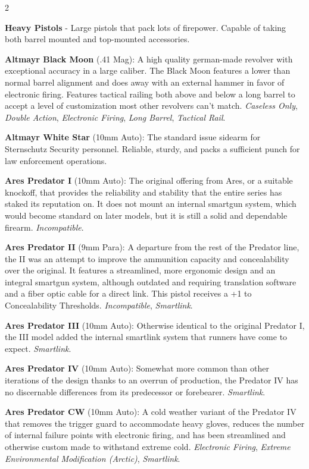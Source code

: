 \documentclass[
  oneside]{article}
\begin{document}
\begin{multicols}{2}

\textbf{Heavy Pistols} - Large pistols that pack
lots of firepower. Capable of taking both barrel
mounted and top-mounted accessories.

\textbf{Altmayr Black Moon} (.41 Mag): A high
quality german-made revolver with exceptional
accuracy in a large caliber. The Black Moon
features a lower than normal barrel alignment and
does away with an external hammer in favor of
electronic firing. Features tactical railing both
above and below a long barrel to accept a level of
customization most other revolvers can't match.
\emph{Caseless Only}, \emph{Double Action},
\emph{Electronic Firing}, \emph{Long Barrel},
\emph{Tactical Rail}.

\textbf{Altmayr White Star} (10mm Auto): The
standard issue sidearm for Sternschutz Security
personnel. Reliable, sturdy, and packs a
sufficient punch for law enforcement operations.

\textbf{Ares Predator I} (10mm Auto): The original
offering from Ares, or a suitable knockoff, that
provides the reliability and stability that the
entire series has staked its reputation on. It
does not mount an internal smartgun system, which
would become standard on later models, but it is
still a solid and dependable firearm.
\emph{Incompatible}.

\textbf{Ares Predator II} (9mm Para): A departure
from the rest of the Predator line, the II was an
attempt to improve the ammunition capacity and
concealability over the original. It features a
streamlined, more ergonomic design and an integral
smartgun system, although outdated and requiring
translation software and a fiber optic cable for a
direct link. This pistol receives a +1 to
Concealability Thresholds. \emph{Incompatible},
\emph{Smartlink}.

\textbf{Ares Predator III} (10mm Auto): Otherwise
identical to the original Predator I, the III
model added the internal smartlink system that
runners have come to expect. \emph{Smartlink}.

\textbf{Ares Predator IV} (10mm Auto): Somewhat
more common than other iterations of the design
thanks to an overrun of production, the Predator
IV has no discernable differences from its
predecessor or forebearer. \emph{Smartlink}.

\textbf{Ares Predator CW} (10mm Auto): A cold
weather variant of the Predator IV that removes
the trigger guard to accommodate heavy gloves,
reduces the number of internal failure points with
electronic firing, and has been streamlined and
otherwise custom made to withstand extreme cold.
\emph{Electronic Firing}, \emph{Extreme
Environmental Modification (Arctic)},
\emph{Smartlink}.


\end{multicols}
\end{document}
